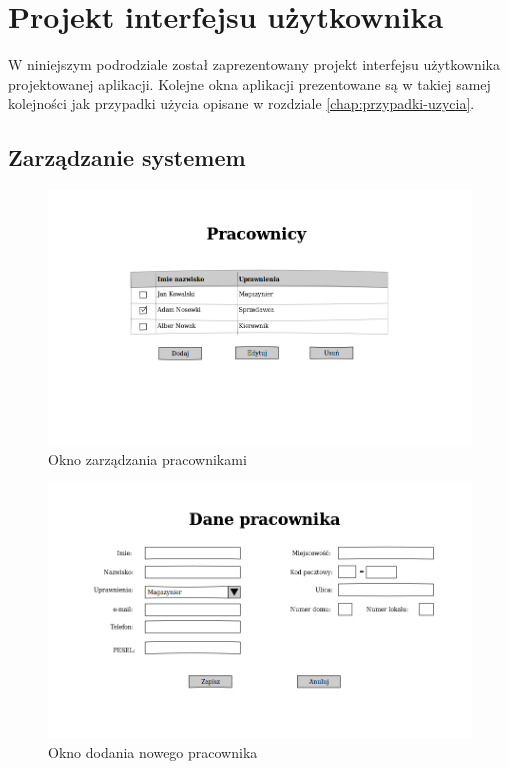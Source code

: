 \section{Projekt interfejsu użytkownika}
W niniejszym podrodziale został zaprezentowany projekt interfejsu użytkownika
projektowanej aplikacji. Kolejne okna aplikacji prezentowane są w takiej samej
kolejności jak przypadki użycia opisane w rozdziale \ref{chap:przypadki-uzycia}.

\subsection{Zarządzanie systemem}
\begin{figure}[!htb]
  \begin{center}
    \includegraphics[scale=0.45]{../img/interfejs/zarzadzanie-pracownikami.png}
  \end{center}
  \caption{Okno zarządzania pracownikami}
\end{figure}
\FloatBarrier

\begin{figure}[!htb]
  \begin{center}
    \includegraphics[scale=0.45]{../img/interfejs/utworzenie-pracownika.png}
  \end{center}
  \caption{Okno dodania nowego pracownika}
\end{figure}
\FloatBarrier

